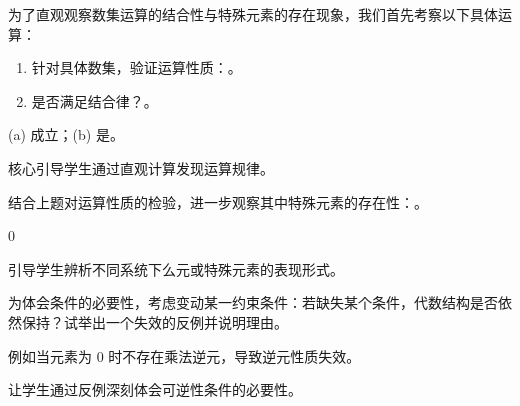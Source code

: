 \begin{probchain}

\item {} 为了直观观察数集运算的结合性与特殊元素的存在现象，我们首先考察以下具体运算：
\begin{enumerate}
    \item 针对具体数集，验证运算性质：\fillin[成立]{20mm}。
    \ansspace{1.2cm}
    \item 是否满足结合律？\fillin[是]{20mm}。
    \ansspace{1.2cm}
\end{enumerate}
\begin{solution}
(a) 成立；(b) 是。
\end{solution}
\begin{teacherNote}
核心引导学生通过直观计算发现运算规律。
\end{teacherNote}

\item {} 结合上题对运算性质的检验，进一步观察其中特殊元素的存在性：\fillin[0]{15mm}。
\ansspace{1.5cm}
\begin{solution}
0
\end{solution}
\begin{teacherNote}
引导学生辨析不同系统下么元或特殊元素的表现形式。
\end{teacherNote}

\item {} 为体会条件的必要性，考虑变动某一约束条件：若缺失某个条件，代数结构是否依然保持？试举出一个失效的反例并说明理由。
\ansspace{2.0cm}
\begin{solution}
例如当元素为 0 时不存在乘法逆元，导致逆元性质失效。
\end{solution}
\begin{teacherNote}
让学生通过反例深刻体会可逆性条件的必要性。
\end{teacherNote}


\end{probchain}
